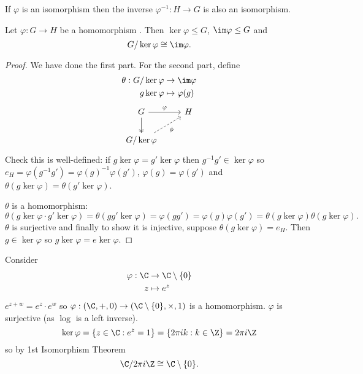 \documentclass[a4paper]{article}
\begin{document}
\begin{ex}
  If \(\varphi\) is an isomorphism then the inverse \(\varphi^{-1}: H \to G\) is also an isomorphism.
\end{ex}

\begin{theorem}
  Let \(\varphi: G \to H\) be a homomorphism . Then \(\ker \varphi \leq G\), \(\im \varphi \leq G\) and
  \[
    G/\ker \varphi \cong \im \varphi.
  \]
\end{theorem}

\begin{proof}
  We have done the first part. For the second part, define
  \begin{align*}
    \theta: G/\ker \varphi &\to \im \varphi \\
    g\ker \varphi &\mapsto \varphi(g)
  \end{align*}
  \[
    \begin{tikzcd}
      G \ar[r, "\varphi"] \ar[d, two heads] & H \\
      G/\ker \varphi \ar[ur, dashed, "\phi"']
    \end{tikzcd}
  \]
  Check this is well-defined: if \(g\ker \varphi = g'\ker \varphi\) then \(g^{-1}g' \in \ker \varphi\) so \(e_H = \varphi(g^{-1}g') = \varphi(g)^{-1}\varphi(g')\), \(\varphi(g) = \varphi(g')\) and \(\theta(g\ker \varphi) = \theta(g'\ker \varphi)\).

  \(\theta\) is a homomorphism:
  \[
    \theta(g\ker \varphi \cdot g'\ker \varphi) = \theta(gg' \ker \varphi) = \varphi(gg') = \varphi(g)\varphi(g') = \theta(g\ker \varphi) \theta(g\ker \varphi).
  \]
  \(\theta\) is surjective and finally to show it is injective, suppose \(\theta(g\ker \varphi) = e_H\). Then \(g \in \ker \varphi\) so \(g\ker \varphi = e\ker \varphi\).
\end{proof}

\begin{eg}
  Consider
  \begin{align*}
    \varphi: \C &\to \C \setminus \{0\} \\
    z &\mapsto e^z
  \end{align*}
  \(e^{z + w} = e^z \cdot e^w\) so \(\varphi: (\C, +, 0) \to (\C \setminus \{0\}, \times, 1)\) is a homomorphism. \(\varphi\) is surjective (as \(\log\) is a left inverse).
  \[
    \ker \varphi = \{z \in \C: e^z = 1\} = \{2\pi ik: k \in \Z\} = 2\pi i\Z
  \]
  so by 1st Isomorphism Theorem
  \[
    \C/2\pi i\Z \cong \C \setminus \{0\}.
  \]
\end{eg}
\end{document}

